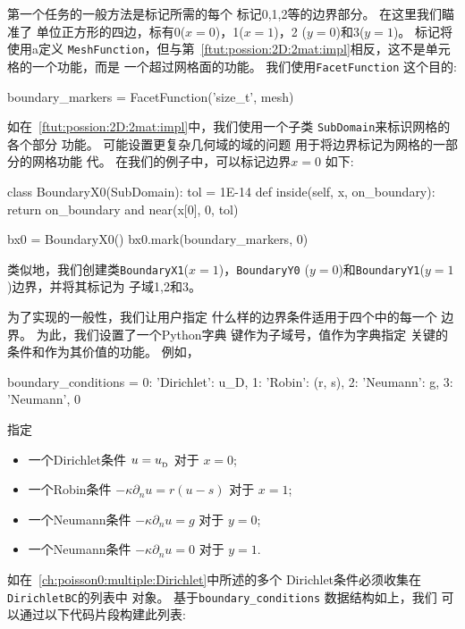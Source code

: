 \noindent
第一个任务的一般方法是标记所需的每个
标记0,1,2等的边界部分。 在这里我们瞄准了
单位正方形的四边，标有0($x = 0$)，1($x = 1$)，2
($y = 0$)和3($y = 1$)。 标记将使用a定义
\texttt{MeshFunction}，但与第~\ref{ftut:possion:2D:2mat:impl}相反，这不是单元格的一个功能，而是
一个超过网格面的功能。 我们使用\texttt{FacetFunction}
这个目的:

\begin{python}
boundary_markers = FacetFunction('size_t', mesh)
\end{python}
如在~\ref{ftut:possion:2D:2mat:impl}中，我们使用一个子类
\texttt{SubDomain}来标识网格的各个部分
功能。 可能设置更复杂几何域的域的问题
用于将边界标记为网格的一部分的网格功能
代。 在我们的例子中，可以标记边界$x = 0$
如下:

\begin{python}
class BoundaryX0(SubDomain):
    tol = 1E-14
    def inside(self, x, on_boundary):
        return on_boundary and near(x[0], 0, tol)

bx0 = BoundaryX0()
bx0.mark(boundary_markers, 0)
\end{python}
类似地，我们创建类\texttt{BoundaryX1}($x = 1$)，\texttt{BoundaryY0}
($y = 0$)和\texttt{BoundaryY1}($y = 1$)边界，并将其标记为
子域1,2和3。

为了实现的一般性，我们让用户指定
什么样的边界条件适用于四个中的每一个
边界。 为此，我们设置了一个Python字典
键作为子域号，值作为字典指定
关键的条件和作为其价值的功能。
例如，

\begin{python}
boundary_conditions = {0: {'Dirichlet': u_D},
                       1: {'Robin':     (r, s)},
                       2: {'Neumann':   g},
                       3: {'Neumann',   0}}
\end{python}
指定

\begin{itemize}
 \item 一个Dirichlet条件 $u = \ub$ 对于 $x = 0$;

 \item 一个Robin条件 $-\kappa\partial_n u = r(u-s)$ 对于 $x = 1$;

 \item 一个Neumann条件 $-\kappa\partial_n u = g$ 对于 $y = 0$;

 \item 一个Neumann条件 $-\kappa\partial_n u = 0$ 对于 $y = 1$.
\end{itemize}

\noindent
如在~\ref{ch:poisson0:multiple:Dirichlet}中所述的多个
Dirichlet条件必须收集在\texttt{DirichletBC}的列表中
对象。 基于\verb!boundary_conditions! 数据结构如上，我们
可以通过以下代码片段构建此列表:

